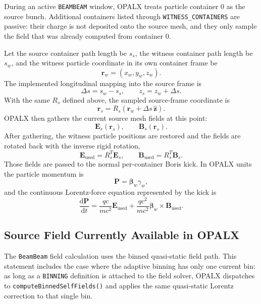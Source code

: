 \documentclass[11pt]{article}
\newcommand{\vect}[1]{\boldsymbol{#1}}
\newcommand{\dd}{\mathrm{d}}
\newcommand{\E}{\vect{E}}
\newcommand{\B}{\vect{B}}
\newcommand{\Pmom}{\vect{P}}
\newcommand{\betav}{\boldsymbol{\beta}}
\numberwithin{equation}{section}
\begin{document}
During an active \texttt{BEAMBEAM} window, OPALX treats particle container 0 as
the source bunch.  Additional containers listed through
\texttt{WITNESS\_CONTAINERS} are passive: their charge is not deposited onto the
source mesh, and they only sample the field that was already computed from
container 0.

Let the source container path length be \(s_s\), the witness container path
length be \(s_w\), and the witness particle coordinate in its own container frame
be
\begin{equation}
  \vect r_w = (x_w,y_w,z_w).
\end{equation}
The implemented longitudinal mapping into the source frame is
\begin{equation}
  \Delta s = s_w-s_s,
  \qquad
  z_s = z_w + \Delta s .
\end{equation}
With the same \(R_s\) defined above, the sampled source-frame coordinate is
\begin{equation}
  \vect r_s
  =
  R_s\left(\vect r_w + \Delta s\,\hat{\vect z}\right).
\end{equation}
OPALX then gathers the current source mesh fields at this point:
\begin{equation}
  \E_s(\vect r_s), \qquad \B_s(\vect r_s).
\end{equation}
After gathering, the witness particle positions are restored and the fields are
rotated back with the inverse rigid rotation,
\begin{equation}
  \E_{\mathrm{used}} = R_s^T \E_s,
  \qquad
  \B_{\mathrm{used}} = R_s^T \B_s.
\end{equation}
Those fields are passed to the normal per-container Boris kick.  In OPALX units
the particle momentum is
\begin{equation}
  \Pmom = \betav_w \gamma_w,
\end{equation}
and the continuous Lorentz-force equation represented by the kick is
\begin{equation}
  \frac{\dd \Pmom}{\dd t}
  =
  \frac{q c}{m c^2}\E_{\mathrm{used}}
  +
  \frac{q c^2}{m c^2}\betav_w \times \B_{\mathrm{used}}.
\end{equation}

\subsection{Source Field Currently Available in OPALX}

The \texttt{BeamBeam} field calculation uses the binned quasi-static field path.  This
statement includes the case where the adaptive binning has only one current bin:
as long as a \texttt{BINNING} definition is attached to the field solver, OPALX
dispatches to \texttt{computeBinnedSelfFields()} and applies the same
quasi-static Lorentz correction to that single bin.
\end{document}
